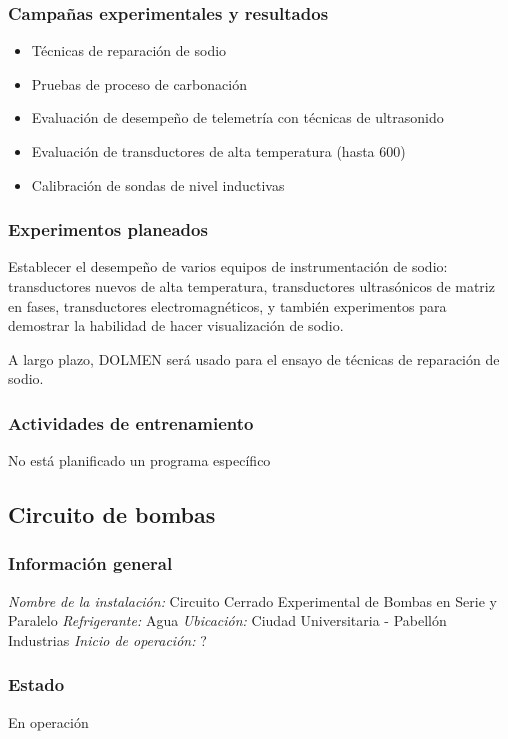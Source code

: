 \documentclass{article}
\begin{document}
\subsubsection*{Campañas experimentales y resultados}
\begin{itemize}
    \item Técnicas de reparación de sodio
    \item Pruebas de proceso de carbonación
    \item Evaluación de desempeño de telemetría con técnicas de ultrasonido
    \item Evaluación de transductores de alta temperatura (hasta 600\celsius)
    \item Calibración de sondas de nivel inductivas
\end{itemize}
\subsubsection*{Experimentos planeados}
Establecer el desempeño de varios equipos de instrumentación de sodio: transductores nuevos de alta temperatura, transductores ultrasónicos de matriz en fases, transductores electromagnéticos, y también experimentos para demostrar la habilidad de hacer visualización de sodio.

A largo plazo, DOLMEN será usado para el ensayo de técnicas de reparación de sodio.
\subsubsection*{Actividades de entrenamiento}
No está planificado un programa específico
\newpage
\subsection{Circuito de bombas}
\subsubsection*{Información general}
\textit{Nombre de la instalación: }Circuito Cerrado Experimental de Bombas en Serie y Paralelo
\textit{Refrigerante: }Agua
\textit{Ubicación: }Ciudad Universitaria - Pabellón Industrias
\textit{Inicio de operación: }?
\subsubsection*{Estado}
En operación
\end{document}
